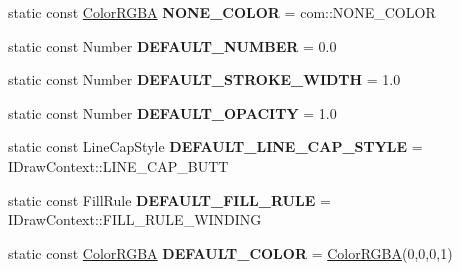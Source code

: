 \begin{DoxyCompactItemize}
\item 
\hypertarget{classsambag_1_1disco_1_1graphic_elements_1_1_style_a982e9f57da97d038d75ed04145cd10ee}{
static const \hyperlink{structsambag_1_1com_1_1_color_r_g_b_a}{ColorRGBA} {\bfseries NONE\_\-COLOR} = com::NONE\_\-COLOR}
\label{classsambag_1_1disco_1_1graphic_elements_1_1_style_a982e9f57da97d038d75ed04145cd10ee}

\item 
\hypertarget{classsambag_1_1disco_1_1graphic_elements_1_1_style_a0740472f83f0608b27b929b85692f04c}{
static const Number {\bfseries DEFAULT\_\-NUMBER} = 0.0}
\label{classsambag_1_1disco_1_1graphic_elements_1_1_style_a0740472f83f0608b27b929b85692f04c}

\item 
\hypertarget{classsambag_1_1disco_1_1graphic_elements_1_1_style_a8ea45eadc4a8d55dd0d9e5fa614eb44c}{
static const Number {\bfseries DEFAULT\_\-STROKE\_\-WIDTH} = 1.0}
\label{classsambag_1_1disco_1_1graphic_elements_1_1_style_a8ea45eadc4a8d55dd0d9e5fa614eb44c}

\item 
\hypertarget{classsambag_1_1disco_1_1graphic_elements_1_1_style_a1c4766273a34225258c57555f9a9c022}{
static const Number {\bfseries DEFAULT\_\-OPACITY} = 1.0}
\label{classsambag_1_1disco_1_1graphic_elements_1_1_style_a1c4766273a34225258c57555f9a9c022}

\item 
\hypertarget{classsambag_1_1disco_1_1graphic_elements_1_1_style_a8cf9cfff7f010396fddae57ff1468e7a}{
static const LineCapStyle {\bfseries DEFAULT\_\-LINE\_\-CAP\_\-STYLE} = IDrawContext::LINE\_\-CAP\_\-BUTT}
\label{classsambag_1_1disco_1_1graphic_elements_1_1_style_a8cf9cfff7f010396fddae57ff1468e7a}

\item 
\hypertarget{classsambag_1_1disco_1_1graphic_elements_1_1_style_a25292f5a024b64fc0b3746516984f5c0}{
static const FillRule {\bfseries DEFAULT\_\-FILL\_\-RULE} = IDrawContext::FILL\_\-RULE\_\-WINDING}
\label{classsambag_1_1disco_1_1graphic_elements_1_1_style_a25292f5a024b64fc0b3746516984f5c0}

\item 
\hypertarget{classsambag_1_1disco_1_1graphic_elements_1_1_style_a56d6ed87bb40d65515dbe623ad1190d4}{
static const \hyperlink{structsambag_1_1com_1_1_color_r_g_b_a}{ColorRGBA} {\bfseries DEFAULT\_\-COLOR} = \hyperlink{structsambag_1_1com_1_1_color_r_g_b_a}{ColorRGBA}(0,0,0,1)}
\label{classsambag_1_1disco_1_1graphic_elements_1_1_style_a56d6ed87bb40d65515dbe623ad1190d4}


\end{DoxyCompactItemize}
